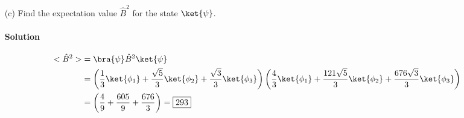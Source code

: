 \documentclass{article}
\begin{document}
\begin{enumerate}
		\item[(c)] Find the expectation value $\hat{B}^2$ for the state $\ket{\psi}$.
		\paragraph{Solution}
		\begin{align*}
			<\hat{B}^2> &= \bra{\psi}\hat{B}^2\ket{\psi} \\
			&= \left( \frac{1}{3} \ket{\phi_1} + \frac{\sqrt{5}}{3} \ket{\phi_2} + \frac{\sqrt{3}}{3} \ket{\phi_3} \right) \left( \frac{4}{3} \ket{\phi_1} + \frac{121\sqrt{5}}{3} \ket{\phi_2} + \frac{676\sqrt{3}}{3} \ket{\phi_3} \right) \\
			&= \left( \frac{4}{9} + \frac{605}{9} + \frac{676}{3} \right) = \boxed{293}
		\end{align*}
		
	\end{enumerate}
			
\clearpage
	
\end{document}
